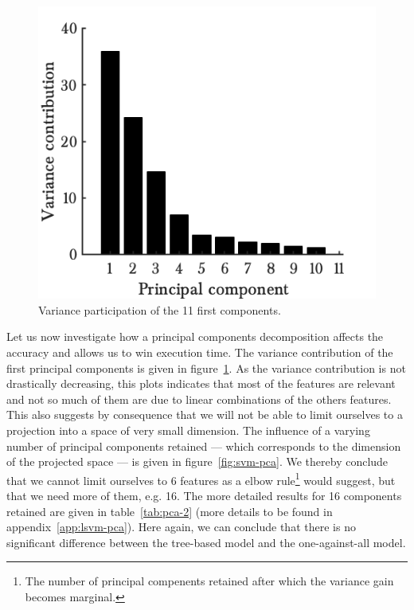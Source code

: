 \begin{figure}
\begin{center}
    \includegraphics[width=.45\textwidth]{parts/chap-4/img-svm/pca-var.png}
    \caption{Variance participation of the 11 first components.}
    \label{fig:pca-var}
\end{center}
\end{figure}
Let us now investigate how a principal components decomposition affects the accuracy and allows us to win execution time. The variance contribution of the first principal components is given in figure~\ref{fig:pca-var}. As the variance contribution is not drastically decreasing, this plots indicates that most of the features are relevant and not so much of them are due to linear combinations of the others features. This also suggests by consequence that we will not be able to limit ourselves to a projection into a space of very small dimension. The influence of a varying number of principal components retained --- which corresponds to the dimension of the projected space --- is given in figure~\ref{fig:svm-pca}. We thereby conclude that we cannot limit ourselves to 6 features as a elbow rule\footnote{The number of principal compenents retained after which the variance gain becomes marginal.} would suggest, but that we need more of them, e.g. 16. The more detailed results for 16 components retained are given in table~\ref{tab:pca-2} (more details to be found in appendix~\ref{app:lsvm-pca}). Here again, we can conclude that there is no significant difference between the tree-based model and the one-against-all model. 

